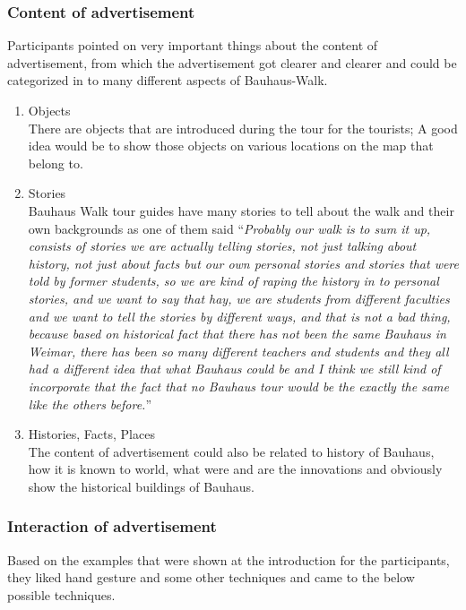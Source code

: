 \subsubsection{Content of advertisement}
Participants pointed on very important things about the content of advertisement, from which the advertisement got clearer and clearer and could be categorized in to many different aspects of Bauhaus-Walk.


\begin {enumerate}

\item	Objects \\
There are objects that are introduced during the tour for the tourists; A good idea would be to show those objects on various locations on the map that belong to.
\item	Stories \\
Bauhaus Walk tour guides have many stories to tell about the walk and their own backgrounds as one of them said ``\emph{Probably our walk is to sum it up, consists of stories we are actually telling stories, not just talking about history, not just about facts but our own personal stories and stories that were told by former students, so we are kind of raping the history in to personal stories, and we want to say that hay, we are students from different faculties and we want to tell the stories by different ways, and that is not a bad thing, because based on historical fact that there has not been the same Bauhaus in Weimar, there has been so many different teachers and students and they all had a different idea that what Bauhaus could be and I think we still kind of incorporate that the fact that no Bauhaus tour would be the exactly the same like the others before.}''
\item	Histories, Facts, Places \\
The content of advertisement could also be related to history of Bauhaus, how it is known to world, what were and are the innovations and obviously show the historical buildings of Bauhaus.


\end{enumerate}

\subsubsection{Interaction of advertisement}
Based on the examples that were shown at the introduction for the participants, they liked hand gesture and some other techniques and came to the below possible techniques.

